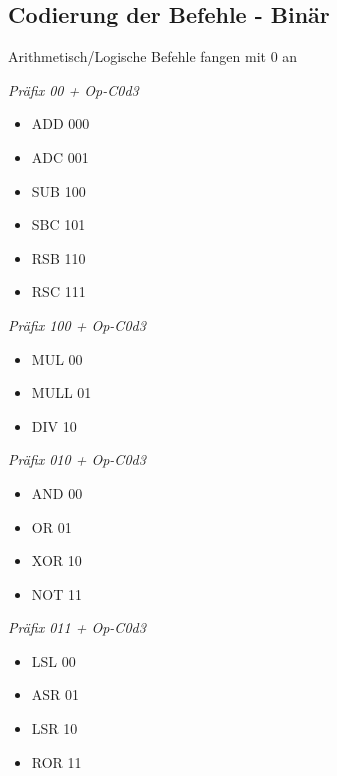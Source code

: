 \documentclass[a4paper]{article}
\begin{document}
\subsection{Codierung der Befehle - Binär}
Arithmetisch/Logische Befehle fangen mit 0 an
\begin{multicols}{2}
\emph{Präfix 00 + {Op-C0d3}}
\begin{itemize}
\item ADD 000
\item ADC 001
\item SUB 100
\item SBC 101
\item RSB 110
\item RSC 111
\end{itemize}

\emph{Präfix 100 + {Op-C0d3}}
\begin{itemize}
\item MUL 00
\item MULL 01
\item DIV 10
\end{itemize}

\emph{Präfix 010 + {Op-C0d3}}
\begin{itemize}
\item AND 00
\item OR 01
\item XOR 10
\item NOT 11
\end{itemize}


\emph{Präfix 011 + {Op-C0d3}}
\begin{itemize}
\item LSL 00
\item ASR 01
\item LSR 10
\item ROR 11
\end{itemize}


\end{multicols}
\end{document}
